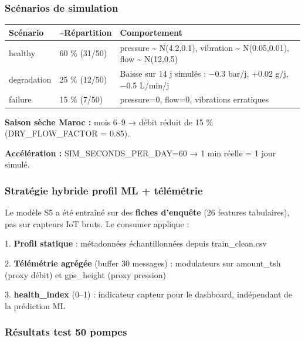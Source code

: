 \documentclass[11pt,a4paper]{report}
\begin{document}
\subsubsection{Scénarios de simulation}



\begin{longtable}{@{}lll@{}}
\toprule
Scénario & \textasciitilde{}Répartition & Comportement \\
\midrule
healthy & 60 \% (31/50) & pressure \textasciitilde{} N(4.2,0.1), vibration \textasciitilde{} N(0.05,0.01), flow \textasciitilde{} N(12,0.5) \\
degradation & 25 \% (12/50) & Baisse sur 14 j simulés : −0.3 bar/j, +0.02 g/j, −0.5 L/min/j \\
failure & 15 \% (7/50) & pressure=0, flow=0, vibrations erratiques \\
\bottomrule
\end{longtable}




\textbf{Saison sèche Maroc :} mois 6–9 → débit réduit de 15 \% (DRY\_FLOW\_FACTOR = 0.85).



\textbf{Accélération :} SIM\_SECONDS\_PER\_DAY=60 → 1 min réelle = 1 jour simulé.



\subsubsection{Stratégie hybride profil ML + télémétrie}



Le modèle S5 a été entraîné sur des \textbf{fiches d'enquête} (26 features tabulaires), pas sur capteurs IoT bruts. Le consumer applique :



1. \textbf{Profil statique} : métadonnées échantillonnées depuis train\_clean.csv

2. \textbf{Télémétrie agrégée} (buffer 30 messages) : modulateurs sur amount\_tsh (proxy débit) et gps\_height (proxy pression)

3. \textbf{health\_index} (0–1) : indicateur capteur pour le dashboard, indépendant de la prédiction ML



\subsubsection{Résultats test 50 pompes}
\end{document}
